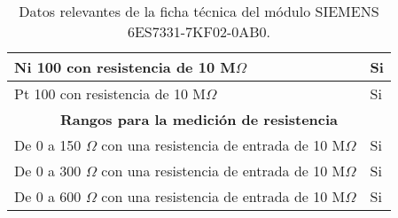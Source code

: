 \begin{table}[ht]
\begin{tabular}{|l|l|}
\multicolumn{1}{|l|}{Ni 100 con resistencia de 10 M$\Omega$}                       & \multicolumn{1}{l|}{Si}    \\ \hline
\multicolumn{1}{|l|}{Pt 100 con resistencia de 10 M$\Omega$}                       & \multicolumn{1}{l|}{Si}    \\ \hline
\multicolumn{2}{|c|}{\textbf{Rangos para la medición de resistencia}}                                    \\ \hline
\multicolumn{1}{|l|}{De 0 a 150 $\Omega$ con una resistencia de entrada de 10 M$\Omega$} & \multicolumn{1}{l|}{Si}    \\ \hline
\multicolumn{1}{|l|}{De 0 a 300 $\Omega$ con una resistencia de entrada de 10 M$\Omega$} & \multicolumn{1}{l|}{Si}    \\ \hline
De 0 a 600 $\Omega$ con una resistencia de entrada de 10 M$\Omega$                       & Si                         \\ \hline
\end{tabular}
\caption{Datos relevantes de la ficha técnica del módulo SIEMENS 6ES7331-7KF02-0AB0.}
\label{cuadro:EntradaA}
\end{table}

\newpage

